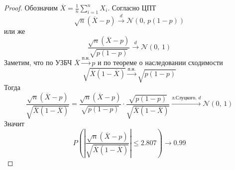 \begin{proof}
	Обозначим $\overline{X} = \frac{1}{n}\sum_{i = 1}^n X_i$. Согласно ЦПТ
	\[\sqrt{n}(\overline{X} - p) \stackrel{d}{\to} \mathcal{N}(0,\, p(1 - p))\]
	или же
	\[\frac{\sqrt{n}(\overline{X} - p)}{\sqrt{p(1 - p)}} \stackrel{d}{\to} \mathcal{N}(0,\,1)\]
	Заметим, что по УЗБЧ $\overline{X} \stackrel{\text{п.н.}}{\to} p$ и по теореме о наследовании сходимости
	\[\sqrt{\overline{X}(1 - \overline{X})} \stackrel{\text{п.н.}}{\to} \sqrt{p(1 - p)}\]
	Тогда
	\[\frac{\sqrt{n}(\overline{X} - p)}{\sqrt{\overline{X}(1 - \overline{X})}} = \frac{\sqrt{n}(\overline{X} - p)}{\sqrt{p(1 - p)}}\cdot\frac{\sqrt{p(1 - p)}}{\sqrt{\overline{X}(1 - \overline{X})}} \stackrel{\text{л.Слуцкого},\, d}{\to}\mathcal{N}(0,\,1)\]
	Значит
	\[P\left(\left|\frac{\sqrt{n}(\overline{X} - p)}{\sqrt{\overline{X}(1 - \overline{X})}}\right| \leq 2.807\right) \to 0.99\]
\end{proof}
